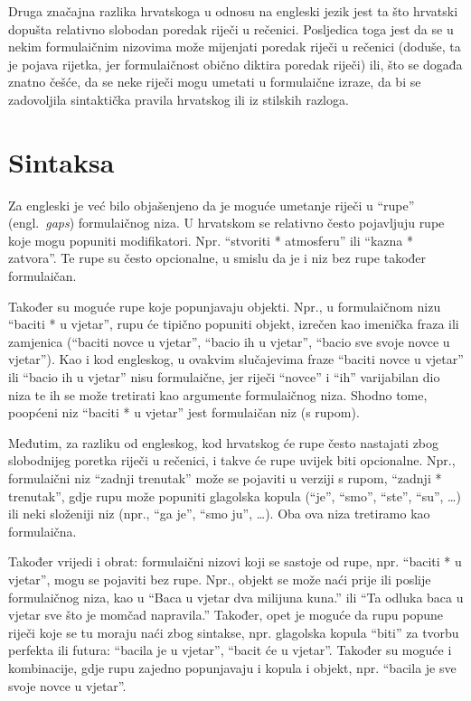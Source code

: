 \documentclass[12pt]{article}
\begin{document}
Druga značajna razlika hrvatskoga u odnosu na engleski jezik jest ta što hrvatski dopušta relativno
slobodan poredak riječi u rečenici. Posljedica toga jest da se u nekim formulaičnim nizovima može mijenjati
poredak riječi u rečenici (doduše, ta je pojava rijetka, jer formulaičnost obično diktira poredak riječi) ili, što
se događa znatno češće, da se neke riječi mogu umetati u formulaične izraze, da bi se zadovoljila
sintaktička pravila hrvatskog ili iz stilskih razloga. 


\section*{Sintaksa}
Za engleski je već bilo objašenjeno da je moguće umetanje riječi u ``rupe'' (engl.~\emph{gaps}) formulaičnog niza. U
hrvatskom se relativno često pojavljuju rupe koje mogu popuniti modifikatori. Npr. ``stvoriti * atmosferu'' ili
``kazna * zatvora''. Te rupe su često opcionalne, u smislu da je i niz bez rupe također formulaičan.

Također su moguće rupe koje popunjavaju objekti. Npr., u formulaičnom nizu ``baciti * u vjetar'', rupu će
tipično popuniti objekt, izrečen kao imenička fraza ili zamjenica (``baciti novce u vjetar'', ``bacio ih u vjetar'',
``bacio sve svoje novce u vjetar''). Kao i kod engleskog, u ovakvim slučajevima fraze ``baciti novce u vjetar''
ili ``bacio ih u vjetar'' nisu formulaične, jer riječi ``novce'' i ``ih'' varijabilan dio niza te ih se može tretirati kao
argumente formulaičnog niza. Shodno tome, poopćeni niz ``baciti * u vjetar'' jest formulaičan niz (s
rupom).

Međutim, za razliku od engleskog, kod hrvatskog će rupe često nastajati zbog slobodnijeg poretka riječi u
rečenici, i takve će rupe uvijek biti opcionalne. Npr., formulaični niz ``zadnji trenutak'' može se pojaviti u
verziji s rupom, ``zadnji * trenutak'', gdje rupu može popuniti glagolska kopula (``je'', ``smo'', ``ste'', ``su'', …)
ili neki složeniji niz (npr., ``ga je'', ``smo ju'', \dots). Oba ova niza tretiramo kao formulaična.


Također vrijedi i obrat: formulaični nizovi koji se sastoje od rupe, npr. ``baciti * u vjetar'', mogu se pojaviti
bez rupe. Npr., objekt se može naći prije ili poslije formulaičnog niza, kao u ``Baca u vjetar dva milijuna
kuna.'' ili ``Ta odluka baca u vjetar sve što je momčad napravila.'' Također, opet je moguće da rupu popune
riječi koje se tu moraju naći zbog sintakse, npr. glagolska kopula ``biti'' za tvorbu perfekta ili futura: ``bacila
je u vjetar'', ``bacit će u vjetar''. Također su moguće i kombinacije, gdje rupu zajedno popunjavaju i
kopula i objekt, npr. ``bacila je sve svoje novce u vjetar''.
\end{document}
